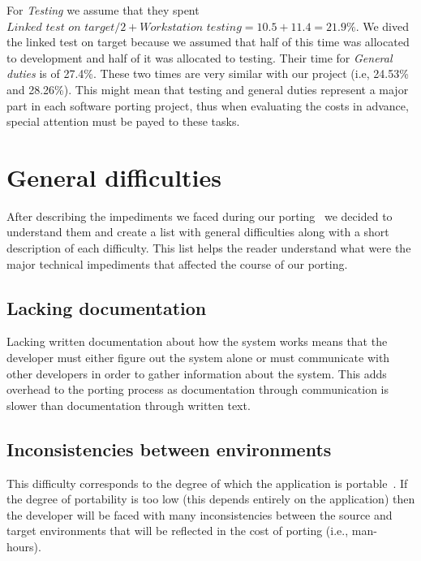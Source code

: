 For \textit{Testing} we assume that they spent $\textit{Linked test on target} /
2 + \textit{Workstation testing} = 10.5 + 11.4 = 21.9\%$. We dived~ the linked
test on target because we assumed that half of this time was allocated to
development and half of it was allocated to testing. Their time for
\textit{General duties} is of 27.4\%. These two times are very similar with our
project (i.e, 24.53\% and 28.26\%). This might mean that testing and general
duties represent a major part in each software porting project, thus when
evaluating the costs in advance, special attention must be payed to these tasks.

\section{General difficulties}

After describing the impediments we faced during our porting~ we decided
to understand them and create a list with general difficulties along with a
short description of each difficulty. This list helps the reader understand what
were the major technical impediments that affected the course of our porting.

\subsection{Lacking documentation}
Lacking written documentation about how the system works means
that the developer must either figure out the system alone or must communicate
with other developers in order to gather information about the system. This adds
overhead to the porting process as documentation through communication is
slower than documentation through written text.

\subsection{Inconsistencies between environments}
This difficulty corresponds to the degree of which the application is
portable~\cite{mooney2004developing}. If the degree of portability is too low
(this depends entirely on the application) then the developer will be faced with
many inconsistencies between the source and target environments that will be
reflected in the cost of porting (i.e., man-hours).~

